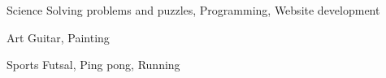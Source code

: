 
\begin{cvskills}
  \cvskill
  {Science}
  {Solving problems and puzzles, Programming, Website development}

  \cvskill
  {Art}
  {Guitar, Painting}

  \cvskill
  {Sports}
  {Futsal, Ping pong, Running}
\end{cvskills}
